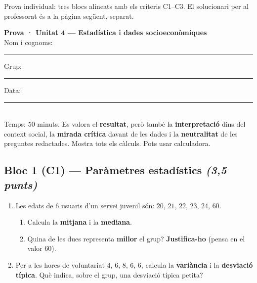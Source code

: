 %
{Prova individual: tres blocs alineats amb els criteris C1–C3. El solucionari per al professorat és a la pàgina següent, separat.}

\begin{tcolorbox}[colback=white, colframe=udnavy, boxrule=0.8pt, arc=2pt,
  left=8pt, right=8pt, top=6pt, bottom=6pt]
\textbf{Prova · Unitat 4 — Estadística i dades socioeconòmiques}\\[4pt]
Nom i cognoms: \rule{6.5cm}{0.4pt} \quad Grup: \rule{1.6cm}{0.4pt} \quad Data: \rule{2.2cm}{0.4pt}\\[6pt]
\small Temps: $50$ minuts. Es valora el \textbf{resultat}, però també la
\textbf{interpretació} dins del context social, la \textbf{mirada crítica} davant de
les dades i la \textbf{neutralitat} de les preguntes redactades. Mostra tots els
càlculs. Pots usar calculadora.
\end{tcolorbox}

\vspace{0.4em}

\subsection*{Bloc 1 (C1) — Paràmetres estadístics \hfill \normalfont\itshape (3,5 punts)}

\begin{enumerate}[label=\textbf{\arabic*.}, leftmargin=2em, itemsep=8pt]
  \item Les edats de $6$ usuaris d'un servei juvenil són: $20$, $21$, $22$, $23$, $24$,
        $60$.
    \begin{enumerate}[label=\alph*), leftmargin=1.6em, topsep=2pt]
      \item Calcula la \textbf{mitjana} i la \textbf{mediana}.
      \item Quina de les dues representa \textbf{millor} el grup? \textbf{Justifica-ho}
            (pensa en el valor $60$).
    \end{enumerate}
  \item Per a les hores de voluntariat $4$, $6$, $8$, $6$, $6$, calcula la
        \textbf{variància} i la \textbf{desviació típica}. Què indica, sobre el grup, una
        desviació típica petita?
\end{enumerate}

